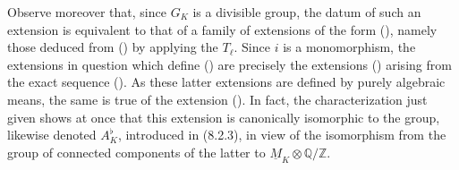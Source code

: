 \noindent
Observe moreover that, since $G_K$ is a divisible group, the datum of
such an extension is equivalent to that of a family of extensions of
the form (), namely those deduced from () by applying the
$T_\ell$.  Since $i$ is a monomorphism, the extensions in question
which define () are precisely the extensions () arising
from the exact sequence ().  As these latter extensions are
defined by purely algebraic means, the same is true of the extension
().  In fact, the characterization just given shows at once that
this extension is canonically isomorphic to the group, likewise denoted
$A_K^{\flat}$, introduced in (8.2.3), in view of the isomorphism  from
the group of connected components of the latter to
$\underline M_K\otimes\mathbb Q/\mathbb Z$.

